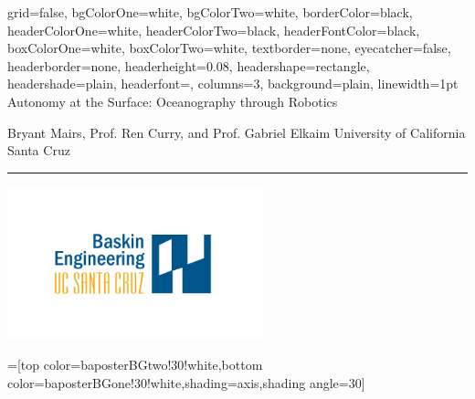 \documentclass[landscape,archE]{baposter}
\begin{document}
\begin{poster}{
  grid=false,
  bgColorOne=white,
  bgColorTwo=white,
  borderColor=black,
  headerColorOne=white,
  headerColorTwo=black,
  headerFontColor=black,
  boxColorOne=white,
  boxColorTwo=white,
  textborder=none,
  eyecatcher=false,
  headerborder=none,
  headerheight=0.08\textheight,
  headershape=rectangle,
  headershade=plain,
  headerfont=\Large\textsf, %
  columns=3,
  background=plain,
  linewidth=1pt
  }
  {} %
  {\sf %
  Autonomy at the Surface: Oceanography through Robotics}
  {\sf %
 Bryant Mairs,
 Prof. Ren Curry, and
 Prof. Gabriel Elkaim \newline
 University of California Santa Cruz \newline
\vspace{-.2in}
\color{ucsc-gold}
\hspace{-.03in}\rule[0.25em]{13.63in}{.09em}
\vspace{-.1in}
  }
  {{\begin{minipage}{16em}
    \hfill
    \includegraphics[height=12em]{SOE_logo}
  \end{minipage}}
  }

  =[top color=baposterBGtwo!30!white,bottom color=baposterBGone!30!white,shading=axis,shading angle=30]

     \newlength{\leftimgwidth}
     \setlength{\leftimgwidth}{0.78em+8.0em}

    \newcommand{\colouredcircle}[1]{%
      \tikz{\useasboundingbox (-0.2em,-0.32em) rectangle(0.2em,0.32em); \draw[draw=black,fill=baposterBGone!80!black!#1!white,line width=0.03em] (0,0) circle(0.18em);}}


\end{poster}
\end{document}

